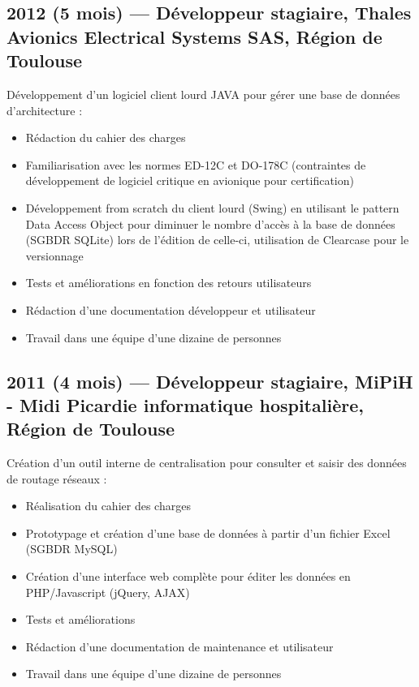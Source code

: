 \documentclass[11pt,a4paper,sans]{article} %
\begin{document}
\subsection{2012 (5 mois) --- Développeur stagiaire, Thales Avionics Electrical Systems SAS, Région de Toulouse}
Développement d'un logiciel client lourd JAVA pour gérer une base de données d'architecture :
\begin{itemize}
  \item Rédaction du cahier des charges
  \item Familiarisation avec les normes ED-12C et DO-178C (contraintes de développement de logiciel critique en
        avionique pour certification)
  \item Développement from scratch du client lourd (Swing) en utilisant le pattern Data Access Object pour diminuer le
        nombre d'accès à la base de données (SGBDR SQLite) lors de l'édition de celle-ci, utilisation de Clearcase pour
        le versionnage
  \item Tests et améliorations en fonction des retours utilisateurs
  \item Rédaction d'une documentation développeur et utilisateur
  \item Travail dans une équipe d'une dizaine de personnes
\end{itemize}

\subsection{2011 (4 mois) --- Développeur stagiaire, MiPiH - Midi Picardie informatique hospitalière, Région de Toulouse}
Création d'un outil interne de centralisation pour consulter et saisir des données de routage réseaux :
\begin{itemize}
  \item Réalisation du cahier des charges
  \item Prototypage et création d'une base de données à partir d'un fichier Excel (SGBDR MySQL)
  \item Création d'une interface web complète pour éditer les données en PHP/Javascript (jQuery, AJAX)
  \item Tests et améliorations
  \item Rédaction d'une documentation de maintenance et utilisateur
  \item Travail dans une équipe d'une dizaine de personnes
\end{itemize}
\end{document}

